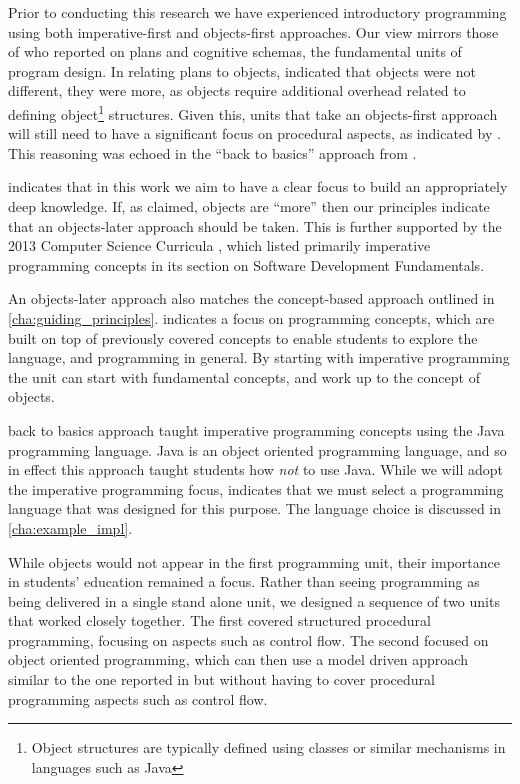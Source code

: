 Prior to conducting this research we have experienced introductory programming using both imperative-first and objects-first approaches. Our view mirrors those of \citet{Rist:1996} who reported on plans and cognitive schemas, the fundamental units of program design. In relating plans to objects, \citet{Rist:1996} indicated that objects were not different, they were more, as objects require additional overhead related to defining object\footnote{Object structures are typically defined using classes or similar mechanisms in languages such as Java} structures. Given this, units that take an objects-first approach will still need to have a significant focus on procedural aspects, as indicated by \citet{Robins:2003}. This reasoning was echoed in the ``back to basics'' approach from \citet{Reges:2006}.

 indicates that in this work we aim to have a clear focus to build an appropriately deep knowledge. If, as \citet{Rist:1996} claimed, objects are ``more'' then our principles indicate that an objects-later approach should be taken. This is further supported by the 2013 Computer Science Curricula \cite{CSC2013}, which listed primarily imperative programming concepts in its section on Software Development Fundamentals.

An objects-later approach also matches the concept-based approach outlined in \cref{cha:guiding_principles}.  indicates a focus on programming concepts, which are built on top of previously covered concepts to enable students to explore the language, and programming in general. By starting with imperative programming the unit can start with fundamental concepts, and work up to the concept of objects.

\citet{Reges:2006} back to basics approach taught imperative programming concepts using the Java programming language. Java is an object oriented programming language, and so in effect this approach taught students how \emph{not} to use Java. While we will adopt the imperative programming focus,  indicates that we must select a programming language that was designed for this purpose. The language choice is discussed in \cref{cha:example_impl}.

%
%

While objects would not appear in the first programming unit, their importance in students' education remained a focus. Rather than seeing programming as being delivered in a single stand alone unit, we designed a sequence of two units that worked closely together. The first covered structured procedural programming, focusing on aspects such as control flow. The second focused on object oriented programming, which can then use a model driven approach similar to the one reported in \citet{Bennedsen:2004} but without having to cover procedural programming aspects such as control flow.

